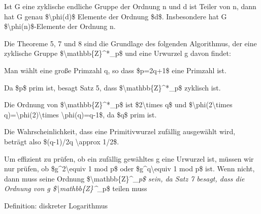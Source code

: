 \documentclass[a4paper]{article}
\begin{document}
\begin{multicols}{3}
\begin{itemize*}
            \begin{itemize*}
                  \item Ist G eine zyklische endliche Gruppe der Ordnung n und d ist Teiler von n, dann hat G genau \$\textbackslash phi(d)\$ Elemente der Ordnung \$d\$. Insbesondere hat G \$\textbackslash phi(n)\$-Elemente der Ordnung n.
            \end{itemize*}
            \item
            Die Theoreme 5, 7 und 8 sind die Grundlage des folgenden Algorithmus,
            der eine zyklische Gruppe \$\textbackslash mathbb\{Z\}\^{}*\_p\$ und
            eine Urwurzel g davon findet:

            \begin{itemize*}
                  \item Man wählt eine große Primzahl q, so dass \$p=2q+1\$ eine Primzahl ist.
                  \begin{itemize*} \item Da \$p\$ prim ist, besagt Satz 5, dass \$\textbackslash mathbb\{Z\}\^{}*\_p\$ zyklisch ist. \item Die Ordnung von \$\textbackslash mathbb\{Z\}\^{}*\_p\$ ist \$2\textbackslash times q\$ und \$\textbackslash phi(2\textbackslash times q)=\textbackslash phi(2)\textbackslash times \textbackslash phi(q)=q-1\$, da \$q\$ prim ist. \item Die Wahrscheinlichkeit, dass eine Primitivwurzel zufällig ausgewählt wird, beträgt also \$(q-1)/2q \textbackslash approx 1/2\$. \item Um effizient zu prüfen, ob ein zufällig gewähltes g eine Urwurzel ist, müssen wir nur prüfen, ob \$g\^{}2\textbackslash equiv 1 mod p\$ oder \$g\^{}q\textbackslash equiv 1 mod p\$ ist. Wenn nicht, dann muss seine Ordnung \$\textbar\textbackslash mathbb\{Z\}\^{}\emph{\_p\textbar\$ sein, da Satz 7 besagt, dass die Ordnung von g \$\textbar\textbackslash mathbb\{Z\}\^{}}\_p\textbar\$ teilen muss \end{itemize*}
            \end{itemize*}
            \item
            Definition: diskreter Logarithmus


\end{itemize*}
\end{multicols}
\end{document}
